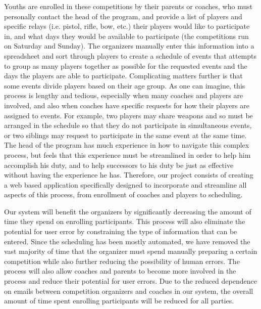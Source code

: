 \documentclass[sigconf]{acmart}
\begin{document}
Youths are enrolled in these competitions by their parents or coaches, who must personally contact the head of the program, and provide a list of players and specific relays (i.e. pistol, rifle, bow, etc.) their players would like to participate in, and what days they would be available to participate (the competitions run on Saturday and Sunday). The organizers manually enter this information into a spreadsheet and sort through players to create a schedule of events that attempts to group as many players together as possible for the requested events and the days the players are able to participate. Complicating matters further is that some events divide players based on their age group. As one can imagine, this process is lengthy and tedious, especially when many coaches and players are involved, and also when coaches have specific requests for how their players are assigned to events. For example, two players may share weapons and so must be arranged in the schedule so that they do not participate in simultaneous events, or two siblings may request to participate in the same event at the same time. The head of the program has much experience in how to navigate this complex process, but feels that this experience must be streamlined in order to help him accomplish his duty, and to help successors to his duty be just as effective without having the experience he has. Therefore, our project consists of creating a web based application specifically designed to incorporate and streamline all aspects of this process, from enrollment of coaches and players to scheduling. 

Our system will benefit the organizers by significantly decreasing the amount of time they spend on enrolling participants. This process will also eliminate the potential for user error by constraining the type of information that can be entered. Since the scheduling has been mostly automated, we have removed the vast majority of time that the organizer must spend manually preparing a certain competition while also further reducing the possibility of human errors. The process will also allow coaches and parents to become more involved in the process and reduce their potential for user errors. Due to the reduced dependence on emails between competition organizers and coaches in our system, the overall amount of time spent enrolling participants will be reduced for all parties. 
\end{document}
